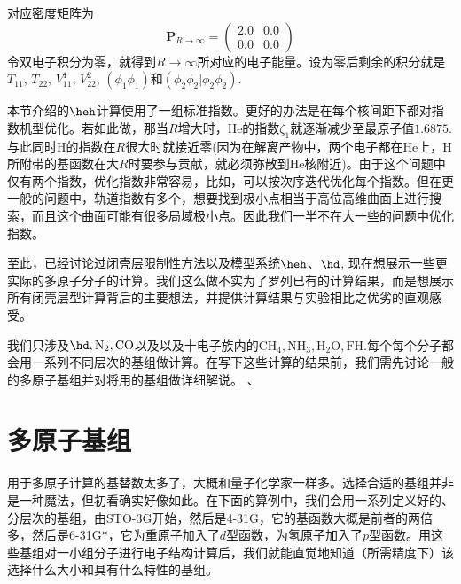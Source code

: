 对应密度矩阵为
\begin{equation}
\label{3.281}
\mathbf{P}_{R\to\infty}=
\begin{pmatrix}
2.0&0.0\\0.0&0.0
\end{pmatrix}
\end{equation}
令双电子积分为零，就得到$R\to\infty$所对应的电子能量。设为零后剩余的积分就是$T_{11}$, $T_{22}$, $V_{11}^1$, $V_{22}^2$, $(\phi_1\phi_1)$和$(\phi_2\phi_2|\phi_2\phi_2)$.

本节介绍的$\heh$计算使用了一组标准指数。更好的办法是在每个核间距下都对指数机型优化。若如此做，那当$R$增大时，$\text{He}$的指数$\zeta_1$就逐渐减少至最原子值$1.6875$. 与此同时$\text{H}$的指数在$R$很大时就接近零(因为在解离产物中，两个电子都在$\text{He}$上，$\text{H}$所附带的基函数在大$R$时要参与贡献，就必须弥散到$\text{He}$核附近)。由于这个问题中仅有两个指数，优化指数非常容易，比如，可以按次序迭代优化每个指数。但在更一般的问题中，轨道指数有多个，想要找到极小点相当于高位高维曲面上进行搜索，而且这个曲面可能有很多局域极小点。因此我们一半不在大一些的问题中优化指数。

至此，已经讨论过闭壳层限制性\hft 方法以及模型系统$\heh$、$\hd$, 现在想展示一些更实际的多原子分子的计算。我们这么做不实为了罗列已有的计算结果，而是想展示所有闭壳层\hft 型计算背后的主要想法，并提供计算结果与实验相比之优劣的直观感受。

我们只涉及$\hd, \text{N}_2, \text{CO}$以及以及十电子族内的$\text{CH}_4, \text{NH}_3, \text{H}_2\text{O}, \text{FH}$.每个每个分子都会用一系列不同层次的基组做计算。在写下这些计算的结果前，我们需先讨论一般的多原子基组并对将用的基组做详细解说。
、
\section{多原子基组}
用于多原子计算的基替数太多了，大概和量子化学家一样多。选择合适的基组并非是一种魔法，但初看确实好像如此。在下面的算例中，我们会用一系列定义好的、分层次的基组，由STO-3G开始，然后是4-31G，它的基函数大概是前者的两倍多，然后是6-31G*，它为重原子加入了$d$型函数，为氢原子加入了$p$型函数。用这些基组对一小组分子进行电子结构计算后，我们就能直觉地知道（所需精度下）该选择什么大小和具有什么特性的基组。

